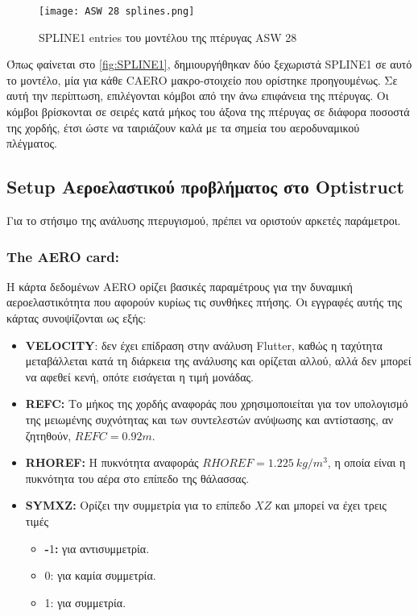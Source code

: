 \begin{figure}[H]
\centering
\texttt{[image: ASW 28 splines.png]}
\caption{\textlatin{SPLINE1 entries} του μοντέλου της πτέρυγας \textlatin{ASW 28}}
\label{fig:SPLINE1}
\end{figure}

Όπως φαίνεται στο \autoref{fig:SPLINE1}, δημιουργήθηκαν δύο ξεχωριστά \textlatin{SPLINE1} σε αυτό το μοντέλο, μία για κάθε \textlatin{CAERO} μακρο-στοιχείο που ορίστηκε προηγουμένως. Σε αυτή την περίπτωση, επιλέγονται κόμβοι από την άνω επιφάνεια της πτέρυγας. Οι κόμβοι βρίσκονται σε σειρές κατά μήκος του άξονα της πτέρυγας σε διάφορα ποσοστά της χορδής, έτσι ώστε να ταιριάζουν καλά με τα σημεία του αεροδυναμικού πλέγματος.


\subsection{\textlatin{Setup} Αεροελαστικού προβλήματος στο \textlatin{Optistruct}} 
\label{aeroelastic-problem-setup}

Για το στήσιμο της ανάλυσης πτερυγισμού, πρέπει να οριστούν αρκετές παράμετροι.

\subsubsection{\textlatin{The AERO card:}}

Η κάρτα δεδομένων \textlatin{AERO} ορίζει βασικές παραμέτρους για την δυναμική αεροελαστικότητα που αφορούν κυρίως τις συνθήκες πτήσης. Οι εγγραφές αυτής της κάρτας συνοψίζονται ως εξής:

\begin{itemize}
\item
\textlatin{\textbf{VELOCITY}}: δεν έχει επίδραση στην ανάλυση \textlatin{Flutter}, καθώς η ταχύτητα μεταβάλλεται κατά τη διάρκεια της ανάλυσης και ορίζεται αλλού, αλλά δεν μπορεί να αφεθεί κενή, οπότε εισάγεται η τιμή μονάδας.
\item
\textlatin{\textbf{REFC:}} Το μήκος της χορδής αναφοράς που χρησιμοποιείται για τον υπολογισμό της μειωμένης συχνότητας και των συντελεστών ανύψωσης και αντίστασης, αν ζητηθούν, \(REFC = 0.92m\).
\item
\textlatin{\textbf{RHOREF:}} Η πυκνότητα αναφοράς \(RHOREF = 1.225\ kg\text{/}m^{3}\), η οποία είναι η πυκνότητα του αέρα στο επίπεδο της θάλασσας.
\item
\textlatin{\textbf{SYMXZ:}} Ορίζει την συμμετρία για το επίπεδο $XZ$ και μπορεί να έχει τρεις τιμές

  \begin{itemize}
  \item
    \textbf{-}1\textbf{:} για αντισυμμετρία.
  \item
    0: για καμία συμμετρία.
  \item
    1: για συμμετρία.
  \end{itemize}
\end{itemize}

